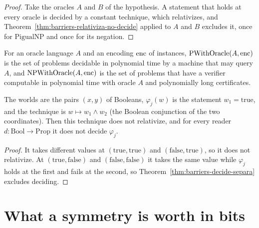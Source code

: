 \begin{proof}
  \leanok
  Take the oracles $A$ and $B$ of the hypothesis. A statement that holds at every oracle is decided
  by a constant technique, which relativizes, and Theorem~\ref{thm:barriers-relativiza-no-decide}
  applied to $A$ and $B$ excludes it, once for $\mathrm{PigualNP}$ and once for its negation.
\end{proof}

\begin{definition}
  \label{def:barriers-oracle-classes}
  \leanok
  For an oracle language $A$ and an encoding $\mathrm{enc}$ of instances, $\mathrm{PWithOracle}(A, \mathrm{enc})$ is
  the set of problems decidable in polynomial time by a machine that may query $A$, and
  $\mathrm{NPWithOracle}(A, \mathrm{enc})$ is the set of problems that have a verifier computable in
  polynomial time with oracle $A$ and polynomially long certificates.
\end{definition}

\begin{theorem}
  \label{thm:barriers-rompe-pero-no-decide}
  \leanok
  The worlds are the pairs $(x, y)$ of Booleans, $\varphi_j(w)$ is the statement $w_1 = \mathrm{true}$,
  and the technique is $w \mapsto w_1 \wedge w_2$ (the Boolean conjunction of the two coordinates).
  Then this technique does not relativize, and for every reader $d : \mathrm{Bool} \to
  \mathrm{Prop}$ it does not decide $\varphi_j$.
  \own{}
\end{theorem}

\begin{proof}
  \leanok
  It takes different values at $(\mathrm{true}, \mathrm{true})$ and $(\mathrm{false},
  \mathrm{true})$, so it does not relativize. At $(\mathrm{true}, \mathrm{false})$ and
  $(\mathrm{false}, \mathrm{false})$ it takes the same value while $\varphi_j$ holds at the first
  and fails at the second, so Theorem~\ref{thm:barriers-decide-separa} excludes deciding.
\end{proof}

\section{What a symmetry is worth in bits}
\label{sec:barriers-symmetry}

